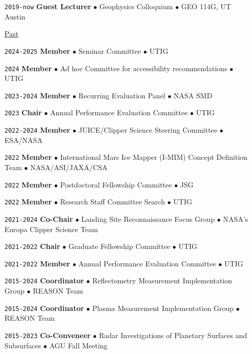 \begin{itemize}[leftmargin=5.8em, labelsep=1.5em]
    \item[\texttt{2019-now}] \textbf{Guest Lecturer} $\bullet$ Geophysics Colloquium $\bullet$  GEO 114G, UT Austin

    \vspace{.5em}
    \item[\ul{Past}] 
    \vspace{.5em}
    
    \item[\texttt{2024-2025}] \textbf{Member} $\bullet$ Seminar Committee $\bullet$ UTIG
    
    \item[\texttt{2024}] \textbf{Member} $\bullet$ Ad hoc Committee for accessibility recommendations $\bullet$ UTIG
    \item[\texttt{2023-2024}] \textbf{Member} $\bullet$ Recurring Evaluation Panel $\bullet$ NASA SMD
    \item[\texttt{2023}] \textbf{Chair} $\bullet$ Annual Performance Evaluation Committee $\bullet$ UTIG
    \item[\texttt{2022-2024}] \textbf{Member} $\bullet$ JUICE/Clipper Science Steering Committee $\bullet$ ESA/NASA
    \item[\texttt{2022}] \textbf{Member} $\bullet$ International Mars Ice Mapper (I-MIM) Concept Definition Team $\bullet$ NASA/ASI/JAXA/CSA
    \item[\texttt{2022}] \textbf{Member} $\bullet$ Postdoctoral Fellowship Committee $\bullet$ JSG
    \item[\texttt{2022}] \textbf{Member} $\bullet$ Research Staff Committee Search $\bullet$ UTIG
    \item[\texttt{2021-2024}] \textbf{Co-Chair} $\bullet$ Landing Site Reconnaissance Focus Group  $\bullet$ NASA's Europa Clipper Science Team
    \item[\texttt{2021-2022}] \textbf{Chair} $\bullet$ Graduate Fellowship Committee $\bullet$ UTIG
    \item[\texttt{2021-2022}] \textbf{Member} $\bullet$ Annual Performance Evaluation Committee $\bullet$ UTIG
    \item[\texttt{2015-2024}] \textbf{Coordinator} $\bullet$ Reflectometry Measurement Implementation Group $\bullet$ REASON Team
    \item[\texttt{2015-2024}] \textbf{Coordinator} $\bullet$ Plasma Measurement Implementation Group $\bullet$ REASON Team
    \item[\texttt{2015-2023}] \textbf{Co-Conveneer} $\bullet$  Radar Investigations of Planetary Surfaces and Subsurfaces $\bullet$ AGU Fall Meeting

\end{itemize}
